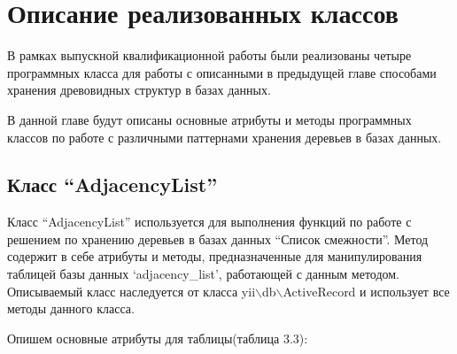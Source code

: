 \documentclass[a4paper,14pt]{extreport}
\theoremstyle{definition}
\begin{document}
\section{Описание реализованных классов}
В рамках выпускной квалификационной работы были реализованы четыре программных класса для работы с описанными в предыдущей главе способами хранения древовидных структур в базах данных.

В данной главе будут описаны основные атрибуты и методы программных классов по работе с различными паттернами хранения деревьев в базах данных.
\subsection{Класс “AdjacencyList”}
Класс “AdjacencyList” используется для выполнения функций по работе с решением по хранению деревьев в базах данных “Список смежности”. Метод содержит в себе атрибуты и методы, предназначенные для манипулирования таблицей базы данных ‘adjacency\_list’, работающей с данным методом. Описываемый класс наследуется от класса yii$\backslash$db$\backslash$ActiveRecord и использует все методы данного класса.

Опишем основные атрибуты для таблицы(таблица 3.3):
\begin{table}[H]
\end{table}
\end{document}
